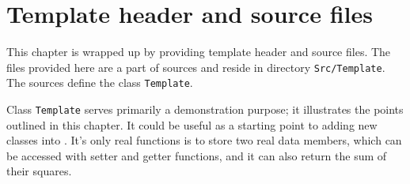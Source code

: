 \section{Template header and source files}
\label{sec:templates}

This chapter is wrapped up by providing template header and source files.
The files provided here are a part of {\psiboil} sources and reside in
directory {\tt Src/Template}. The sources define the class {\tt Template}. 

Class {\tt Template} serves primarily a demonstration purpose; it illustrates
the points outlined in this chapter. It could be useful as a starting point to
adding new classes into {\psiboil}. It's only real functions is to store two
real data members, which can be accessed with setter and getter functions, and
it can also return the sum of their squares.

